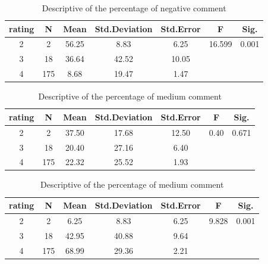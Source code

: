 \documentclass{mcmthesis}
\begin{document}
\begin{table}[H]
	\center
	\caption{Descriptive of the percentage of negative comment}
	\label{type}
	\begin{tabular}{c|c|c|c|c|c|c}
		\hline
		\textbf{rating} & \textbf{N} & \textbf{Mean}& \textbf{Std.Deviation}& \textbf{Std.Error}& \textbf{F}& \textbf{Sig.} \\ \hline 
		2        & 2             & 56.25           & 8.83         & 6.25    & 16.599 & 0.001    \\
		3          & 18           & 36.64           & 42.52         & 10.05    &  & \\
		4            & 175         & 8.68           & 19.47         & 1.47    &  & \\ \hline
	\end{tabular}
\end{table}

\begin{table}[H]
	\center
	\caption{Descriptive of the percentage of medium comment}
	\label{type}
	\begin{tabular}{c|c|c|c|c|c|c}
		\hline
		\textbf{rating} & \textbf{N} & \textbf{Mean}& \textbf{Std.Deviation}& \textbf{Std.Error}& \textbf{F}& \textbf{Sig.} \\ \hline 
		2        & 2             & 37.50           & 17.68         & 12.50    & 0.40 & 0.671    \\
		3          & 18           & 20.40           & 27.16         & 6.40    &  & \\
		4            & 175         & 22.32           & 25.52         & 1.93    &  & \\ \hline
	\end{tabular}
\end{table}

\begin{table}[H]
	\center
	\caption{Descriptive of the percentage of medium comment}
	\label{type}
	\begin{tabular}{c|c|c|c|c|c|c}
		\hline
		\textbf{rating} & \textbf{N} & \textbf{Mean}& \textbf{Std.Deviation}& \textbf{Std.Error}& \textbf{F}& \textbf{Sig.} \\ \hline 
		2        & 2             & 6.25           & 8.83         & 6.25    & 9.828 & 0.001    \\
		3          & 18           & 42.95           & 40.88         & 9.64    &  & \\
		4            & 175         & 68.99           & 29.36         & 2.21    &  & \\ \hline
	\end{tabular}
\end{table}
\end{document}
